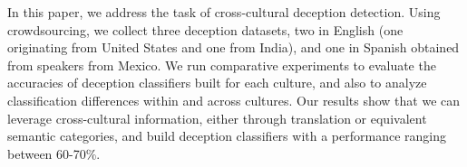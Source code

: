 In this paper, we address the task of cross-cultural deception detection. Using crowdsourcing, we collect three deception datasets, two in English (one originating from United States and one from India), and one in Spanish obtained from speakers from Mexico. We run comparative experiments to evaluate the accuracies of deception classifiers built for each culture, and also to analyze classification differences within and across cultures. Our results show that we can leverage cross-cultural information, either through translation or equivalent semantic categories, and build deception classifiers with a performance ranging between 60-70\%.
